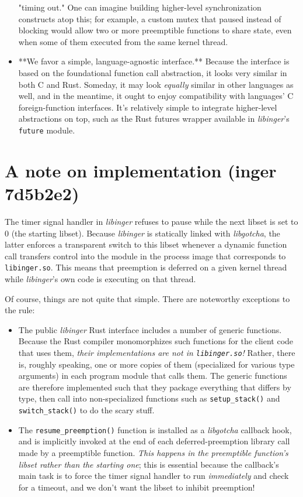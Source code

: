 \documentclass[12pt,letterpaper]{book}
\begin{document}
\begin{itemize}
	"timing out."  One can imagine building higher-level synchronization constructs atop this; for
	example, a custom mutex that paused instead of blocking would allow two or more preemptible
	functions to share state, even when some of them executed from the same kernel thread.
\item **We favor a simple, language-agnostic interface.**  Because the interface is based on the
	foundational function call abstraction, it looks very similar in both C and Rust.  Someday, it
	may look \textit{equally} similar in other languages as well, and in the meantime, it ought to enjoy
	compatibility with languages' C foreign-function interfaces.  It's relatively simple to integrate
	higher-level abstractions on top, such as the Rust futures wrapper available in \textit{libinger}'s
	\texttt{future} module.
\end{itemize}


\section{A note on implementation (inger 7d5b2e2)}

The timer signal handler in \textit{libinger} refuses to pause while the next libset is set to 0 (the
starting libset).  Because \textit{libinger} is statically linked with \textit{libgotcha}, the latter enforces a
transparent switch to this libset whenever a dynamic function call transfers control into the module
in the process image that corresponds to \texttt{libinger.so}.  This means that preemption is deferred on a
given kernel thread while \textit{libinger}'s own code is executing on that thread.

Of course, things are not quite that simple.  There are noteworthy exceptions to the rule:
\begin{itemize}
\item The public \textit{libinger} Rust interface includes a number of generic functions.  Because the Rust
	compiler monomorphizes such functions for the client code that uses them, \textit{their implementations
	are \textrm{not} in \texttt{libinger.so}!}  Rather, there is, roughly speaking, one or more copies of them
	(specialized for various type arguments) in each program module that calls them.  The generic
	functions are therefore implemented such that they package everything that differs by type, then
	call into non-specialized functions such as \texttt{setup\_stack()} and \texttt{switch\_stack()} to do the scary
	stuff.
\item The \texttt{resume\_preemption()} function is installed as a \textit{libgotcha} callback hook, and is implicitly
	invoked at the end of each deferred-preemption library call made by a preemptible function.
	\textit{This happens in the preemptible function's libset rather than the starting one}; this is
	essential because the callback's main task is to force the timer signal handler to run
	\textit{immediately} and check for a timeout, and we don't want the libset to inhibit preemption!
\end{itemize}
\end{document}
